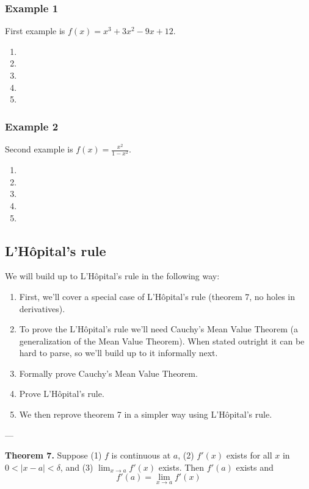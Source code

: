 \subsubsection*{Example 1}
First example is $f(x)=x^3+3x^2-9x+12$.

\begin{enumerate}
\item
\item 
\item 
\item 
\item 
\end{enumerate}

\subsubsection*{Example 2}
Second example is $f(x)=\frac{x^2}{1-x^2}$.

\begin{enumerate}
\item
\item 
\item 
\item 
\item 
\end{enumerate}

\subsection{L'H\^opital's rule}
We will build up to L'H\^opital's rule in the following way:

\begin{enumerate}
\item First, we'll cover a special case of L'H\^opital's rule (theorem
  7, no holes in derivatives).
\item To prove the L'H\^opital's rule we'll need Cauchy's Mean Value
  Theorem (a generalization of the Mean Value Theorem). When stated
  outright it can be hard to parse, so we'll build up to it informally
  next.
\item Formally prove Cauchy's Mean Value Theorem.
\item Prove L'H\^opital's rule.
\item We then reprove theorem 7 in a simpler way using L'H\^opital's
  rule.
\end{enumerate}

---\vs

\textbf{Theorem 7.} Suppose (1) $f$ is continuous at $a$, (2) $f'(x)$
exists for all $x$ in $0<|x-a|<\delta$, and (3) $\lim_{x\to a}f'(x)$ exists.
Then $f'(a)$ exists and
\[f'(a)=\lim_{x\to a}f'(x)\]

